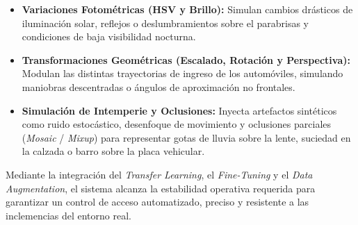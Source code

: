 \begin{itemize}
    \item \textbf{Variaciones Fotométricas (HSV y Brillo):} Simulan cambios
        drásticos de iluminación solar, reflejos o deslumbramientos sobre el
        parabrisas y condiciones de baja visibilidad nocturna.

    \item \textbf{Transformaciones Geométricas (Escalado, Rotación y
        Perspectiva):} Modulan las distintas trayectorias de ingreso de los
        automóviles, simulando maniobras descentradas o ángulos de aproximación
        no frontales.

    \item \textbf{Simulación de Intemperie y Oclusiones:} Inyecta artefactos
        sintéticos como ruido estocástico, desenfoque de movimiento y oclusiones
        parciales (\textit{Mosaic} / \textit{Mixup}) para representar gotas de
        lluvia sobre la lente, suciedad en la calzada o barro sobre la placa
        vehicular.
\end{itemize}

Mediante la integración del \textit{Transfer Learning}, el \textit{Fine-Tuning} y
el \textit{Data Augmentation}, el sistema alcanza la estabilidad operativa
requerida para garantizar un control de acceso automatizado, preciso y resistente
a las inclemencias del entorno real.
